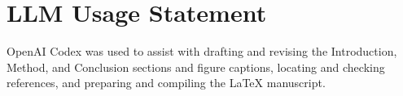 \section*{LLM Usage Statement}
OpenAI Codex was used to assist with drafting and revising the Introduction, Method, and Conclusion sections and figure captions, locating and checking references, and preparing and compiling the LaTeX manuscript.
